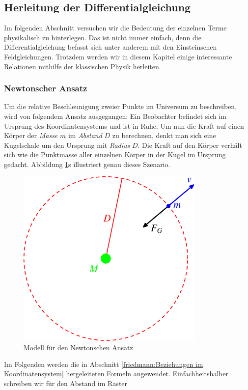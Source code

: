 \begin{refsection}
\subsection{Herleitung der Differentialgleichung \label{friedmann:subsec:Herleitung der Gleichung}}
Im folgenden Abschnitt versuchen wir die Bedeutung der einzelnen Terme physikalisch zu hinterlegen. Das ist nicht immer einfach, denn die Differentialgleichung befasst sich unter anderem mit den Einsteinschen Feldgleichungen. Trotzdem werden wir in diesem Kapitel einige interessante Relationen mithilfe der klassischen Physik herleiten.
\subsubsection{Newtonscher Ansatz}
Um die relative Beschleunigung zweier Punkte im Universum zu beschreiben, wird von folgendem Ansatz ausgegangen: Ein Beobachter befindet sich im Ursprung des Koordinatensystems und ist in Ruhe. Um nun die Kraft auf einen Körper der {\em Masse} $m$ im {\em Abstand} $D$ zu berechnen, denkt man sich eine Kugelschale um den Ursprung mit {\em Radius} $D$. Die Kraft auf den Körper verhält sich wie die Punktmasse aller  einzelnen Körper in der Kugel im Ursprung gedacht. Abbildung \ref{friedmann:gravitation}s illustriert genau dieses Szenario.
\begin{figure}[h]
	\centering
	\includegraphics{friedmann/images/friedmann-5.pdf}
	\caption{Modell für den Newtonschen Ansatz
	\label{friedmann:gravitation}}
\end{figure}%
Im Folgenden werden die in  Abschnitt \ref{friedmann:Beziehungen im Koordinatensystem} hergeleiteten Formeln angewendet. Einfachheitshalber schreiben wir für den Abstand im Raster

\end{refsection}
